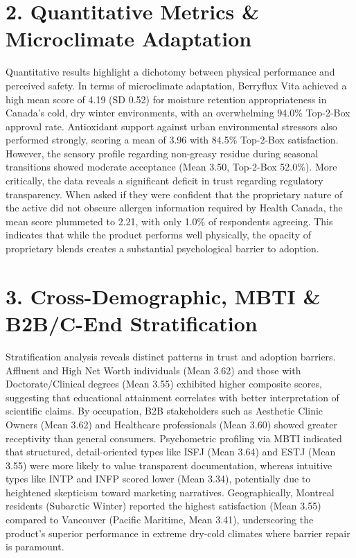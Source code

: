 \documentclass[10pt,twocolumn,a4paper]{article}
\begin{document}
\section{2. Quantitative Metrics \& Microclimate Adaptation}
Quantitative results highlight a dichotomy between physical performance and perceived safety. In terms of microclimate adaptation, Berryflux Vita achieved a high mean score of 4.19 (SD 0.52) for moisture retention appropriateness in Canada's cold, dry winter environments, with an overwhelming 94.0\% Top-2-Box approval rate. Antioxidant support against urban environmental stressors also performed strongly, scoring a mean of 3.96 with 84.5\% Top-2-Box satisfaction. However, the sensory profile regarding non-greasy residue during seasonal transitions showed moderate acceptance (Mean 3.50, Top-2-Box 52.0\%). More critically, the data reveals a significant deficit in trust regarding regulatory transparency. When asked if they were confident that the proprietary nature of the active did not obscure allergen information required by Health Canada, the mean score plummeted to 2.21, with only 1.0\% of respondents agreeing. This indicates that while the product performs well physically, the opacity of proprietary blends creates a substantial psychological barrier to adoption.
\section{3. Cross-Demographic, MBTI \& B2B/C-End Stratification}
Stratification analysis reveals distinct patterns in trust and adoption barriers. Affluent and High Net Worth individuals (Mean 3.62) and those with Doctorate/Clinical degrees (Mean 3.55) exhibited higher composite scores, suggesting that educational attainment correlates with better interpretation of scientific claims. By occupation, B2B stakeholders such as Aesthetic Clinic Owners (Mean 3.62) and Healthcare professionals (Mean 3.60) showed greater receptivity than general consumers. Psychometric profiling via MBTI indicated that structured, detail-oriented types like ISFJ (Mean 3.64) and ESTJ (Mean 3.55) were more likely to value transparent documentation, whereas intuitive types like INTP and INFP scored lower (Mean 3.34), potentially due to heightened skepticism toward marketing narratives. Geographically, Montreal residents (Subarctic Winter) reported the highest satisfaction (Mean 3.55) compared to Vancouver (Pacific Maritime, Mean 3.41), underscoring the product's superior performance in extreme dry-cold climates where barrier repair is paramount.
\end{document}
